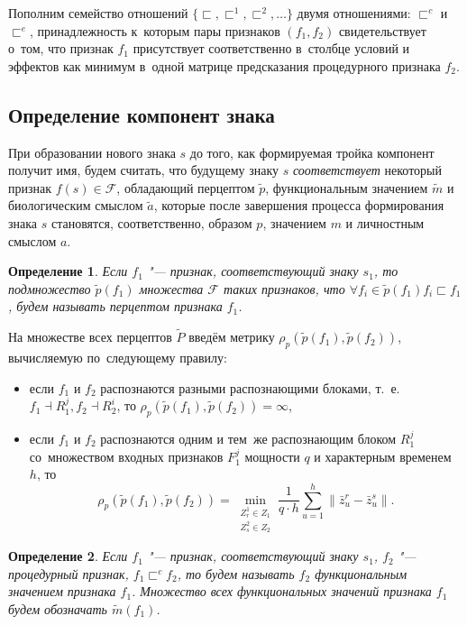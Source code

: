 \documentclass[a4paper, 12pt]{article}
\theoremstyle{plain}
\newtheorem{Def}{Определение}
\begin{document}
		Пополним семейство отношений $\{\sqsubset,\sqsubset^1,\sqsubset^2,\dots\}$ двумя отношениями: $\sqsubset^c$ и $\sqsubset^e$, принадлежность к~которым пары признаков $(f_1,f_2)$ свидетельствует о~том, что признак $f_1$ присутствует соответственно в~столбце условий и эффектов как минимум в~одной матрице предсказания процедурного признака $f_2$.
		
		\subsection{Определение компонент знака}
		При образовании нового знака $s$ до того, как формируемая тройка компонент получит имя, будем считать, что будущему знаку $s$ \textit{соответствует} некоторый признак $f(s)\in\mathcal F$, обладающий перцептом $\tilde p$, функциональным значением $\tilde m$ и биологическим смыслом $\tilde a$, которые после завершения процесса формирования знака $s$ становятся, соответственно, образом $p$, значением $m$ и личностным смыслом $a$.
		
		\begin{Def}
			Если $f_1$ "--- признак, соответствующий знаку $s_1$, то подмножество $\tilde p(f_1)$ множества $\mathcal F$ таких признаков, что $\forall f_i\in\tilde p(f_1) f_i\sqsubset f_1$, будем называть перцептом признака $f_1$.
		\end{Def}
		
		На множестве всех перцептов $\tilde P$ введём метрику $\rho_p(\tilde p(f_1),\tilde p(f_2))$, вычисляемую по~следующему правилу:
		\begin{itemize}
			\item если $f_1$ и $f_2$ распознаются разными распознающими блоками, т.~е. $f_1\dashv R_1^j, f_2\dashv R_2^i$, то $\rho_p(\tilde p(f_1),\tilde p(f_2))=\infty$,
			\item если $f_1$ и $f_2$ распознаются одним и тем~же распознающим блоком $R_1^j$ со~множеством входных признаков $F_1^j$ мощности $q$ и характерным временем $h$, то
			\begin{equation}
				\rho_p(\tilde p(f_1),\tilde p(f_2))=\min\limits_{\substack{Z_r^1\in Z_1\\Z_s^2\in Z_2}}\frac{1}{q\cdot h}\sum\limits_{u=1}^h\|\bar z_u^r-\bar z_u^s\|.
			\end{equation} 
		\end{itemize}
		
		\begin{Def}
			Если $f_1$ "--- признак, соответствующий знаку $s_1$, $f_2$ "--- процедурный признак, $f_1\sqsubset^c f_2$, то будем называть $f_2$ функциональным значением признака $f_1$. Множество всех функциональных значений признака $f_1$ будем обозначать $\tilde m(f_1)$.
		\end{Def}
		
\end{document}
